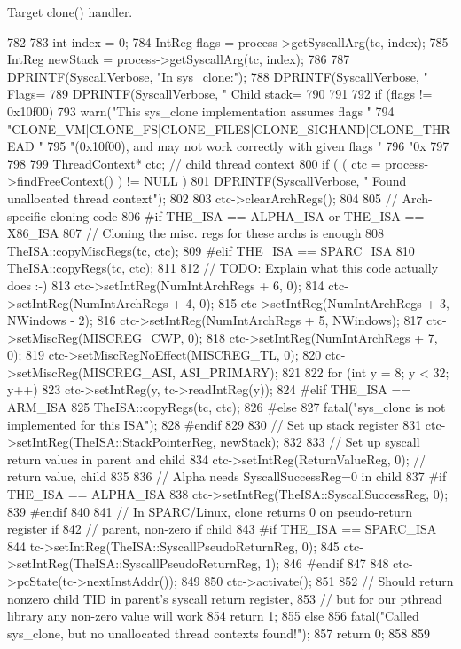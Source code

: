 Target clone() handler. 


\begin{DoxyCode}
782 {
783     int index = 0;
784     IntReg flags = process->getSyscallArg(tc, index);
785     IntReg newStack = process->getSyscallArg(tc, index);
786 
787     DPRINTF(SyscallVerbose, "In sys_clone:\n");
788     DPRINTF(SyscallVerbose, " Flags=%
789     DPRINTF(SyscallVerbose, " Child stack=%
790 
791 
792     if (flags != 0x10f00) {
793         warn("This sys_clone implementation assumes flags "
794              "CLONE_VM|CLONE_FS|CLONE_FILES|CLONE_SIGHAND|CLONE_THREAD "
795              "(0x10f00), and may not work correctly with given flags "
796              "0x%
797     }
798 
799     ThreadContext* ctc; // child thread context
800     if ( ( ctc = process->findFreeContext() ) != NULL ) {
801         DPRINTF(SyscallVerbose, " Found unallocated thread context\n");
802 
803         ctc->clearArchRegs();
804 
805         // Arch-specific cloning code
806         #if THE_ISA == ALPHA_ISA or THE_ISA == X86_ISA
807             // Cloning the misc. regs for these archs is enough
808             TheISA::copyMiscRegs(tc, ctc);
809         #elif THE_ISA == SPARC_ISA
810             TheISA::copyRegs(tc, ctc);
811 
812             // TODO: Explain what this code actually does :-)
813             ctc->setIntReg(NumIntArchRegs + 6, 0);
814             ctc->setIntReg(NumIntArchRegs + 4, 0);
815             ctc->setIntReg(NumIntArchRegs + 3, NWindows - 2);
816             ctc->setIntReg(NumIntArchRegs + 5, NWindows);
817             ctc->setMiscReg(MISCREG_CWP, 0);
818             ctc->setIntReg(NumIntArchRegs + 7, 0);
819             ctc->setMiscRegNoEffect(MISCREG_TL, 0);
820             ctc->setMiscReg(MISCREG_ASI, ASI_PRIMARY);
821 
822             for (int y = 8; y < 32; y++)
823                 ctc->setIntReg(y, tc->readIntReg(y));
824         #elif THE_ISA == ARM_ISA
825             TheISA::copyRegs(tc, ctc);
826         #else
827             fatal("sys_clone is not implemented for this ISA\n");
828         #endif
829 
830         // Set up stack register
831         ctc->setIntReg(TheISA::StackPointerReg, newStack);
832 
833         // Set up syscall return values in parent and child
834         ctc->setIntReg(ReturnValueReg, 0); // return value, child
835 
836         // Alpha needs SyscallSuccessReg=0 in child
837         #if THE_ISA == ALPHA_ISA
838             ctc->setIntReg(TheISA::SyscallSuccessReg, 0);
839         #endif
840 
841         // In SPARC/Linux, clone returns 0 on pseudo-return register if
842         // parent, non-zero if child
843         #if THE_ISA == SPARC_ISA
844             tc->setIntReg(TheISA::SyscallPseudoReturnReg, 0);
845             ctc->setIntReg(TheISA::SyscallPseudoReturnReg, 1);
846         #endif
847 
848         ctc->pcState(tc->nextInstAddr());
849 
850         ctc->activate();
851 
852         // Should return nonzero child TID in parent's syscall return register,
853         // but for our pthread library any non-zero value will work
854         return 1;
855     } else {
856         fatal("Called sys_clone, but no unallocated thread contexts found!\n");
857         return 0;
858     }
859 }
\end{DoxyCode}
